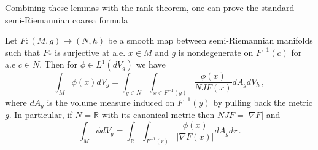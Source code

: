Combining these lemmas with the rank theorem, one can prove the standard semi-Riemannian coarea formula
\begin{theorem}
Let $F:(M,g)\rightarrow (N,h)$ be a smooth map between semi-Riemannian manifolds such that $F_*$ is surjective at a.e. $x\in M$ and $g$ is nondegenerate on $F^{-1}(c)$ for a.e $c\in N$.  Then for $\phi\in L^1(dV_g)$ we have
\begin{equation}
\int_M\phi(x)dV_g=\int_{y\in N}\int_{x\in F^{-1}(y)}\frac{\phi(x)}{NJF(x)}dA_g dV_h\,,
\end{equation}
where $dA_g$ is the volume measure induced on $F^{-1}(y)$ by pulling back the metric $g$.  In particular, if $N=\mathbb{R}$ with its canonical metric then $NJF=|\nabla F|$ and 
\begin{equation}
\int_M \phi dV_g=\int_\mathbb{R}\int_{F^{-1}(r)}\frac{\phi(x)}{|\nabla F(x)|} dA_g dr\,.
\end{equation}
\end{theorem}

